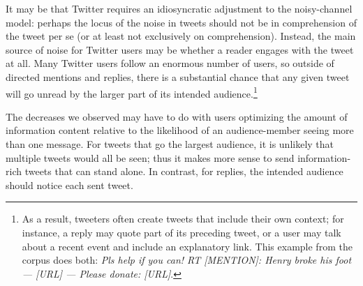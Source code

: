 \documentclass[11pt,letterpaper]{article}
\begin{document}
It may be that Twitter requires an idiosyncratic adjustment to the noisy-channel model: perhaps the locus of the noise in tweets should not be in comprehension of the tweet per se (or at least not exclusively on comprehension). Instead, the main source of noise for Twitter users may be whether a reader engages with the tweet at all. Many Twitter users follow an enormous number of users, so outside of directed mentions and replies, there is a substantial chance that any given tweet will go unread by the larger part of its intended audience.\footnote{As a result, tweeters often create tweets that include their own context; for instance, a reply may quote part of its preceding tweet, or a user may talk about a recent event and include an explanatory link. This example from the corpus does both: {\it Pls help if you can! RT [MENTION]: Henry broke his foot — [URL] — Please donate: [URL]}.}

The decreases we observed may have to do with users optimizing the amount of information content relative to the likelihood of an audience-member seeing more than one message. For tweets that go the largest audience, it is unlikely that multiple tweets would all be seen; thus it makes more sense to send information-rich tweets that can stand alone. In contrast, for replies, the intended audience should notice each sent tweet. 
\end{document}
